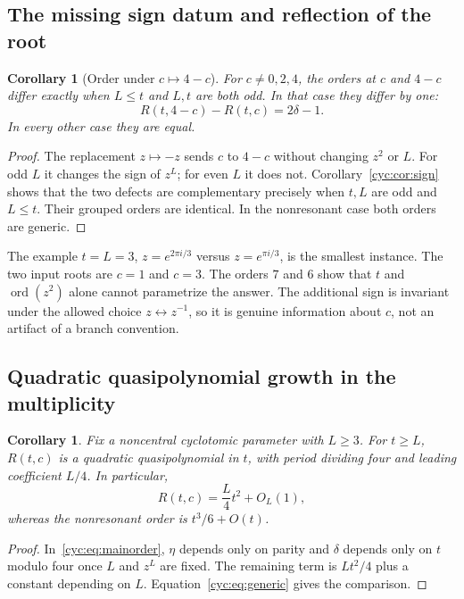 \documentclass[11pt,a4paper]{article}
\numberwithin{equation}{section}
\newtheorem{corollary}[theorem]{Corollary}
\theoremstyle{definition}
\theoremstyle{remark}
\newcommand{\ord}{\operatorname{ord}}
\begin{document}
\subsection{The missing sign datum and reflection of the root}
\begin{corollary}[Order under $c\mapsto4-c$]\label{cyc:cor:c-reflect}
For $c\ne0,2,4$, the orders at $c$ and $4-c$ differ exactly when
$L\le t$ and $L,t$ are both odd.  In that case they differ by one:
\begin{equation}\label{cyc:eq:c-reflect}
 R(t,4-c)-R(t,c)=2\delta-1.
\end{equation}
In every other case they are equal.
\end{corollary}
\begin{proof}
The replacement $z\mapsto-z$ sends $c$ to $4-c$ without changing
$z^2$ or $L$.  For odd $L$ it changes the sign of $z^L$; for even
$L$ it does not.  Corollary~\ref{cyc:cor:sign} shows that the two defects
are complementary precisely when $t,L$ are odd and $L\le t$.
Their grouped orders are identical.  In the nonresonant case both
orders are generic.
\end{proof}

The example $t=L=3$, $z=e^{2\pi i/3}$ versus $z=e^{\pi i/3}$,
is the smallest instance.  The two input roots are $c=1$ and $c=3$.
The orders $7$ and $6$ show that $t$ and $\ord(z^2)$ alone cannot
parametrize the answer.  The additional sign is invariant under the
allowed choice $z\leftrightarrow z^{-1}$, so it is genuine information
about $c$, not an artifact of a branch convention.

\subsection{Quadratic quasipolynomial growth in the multiplicity}
\begin{corollary}\label{cyc:cor:quasipoly}
Fix a noncentral cyclotomic parameter with $L\ge3$.  For $t\ge L$,
$R(t,c)$ is a quadratic quasipolynomial in $t$, with period dividing
four and leading coefficient $L/4$.  In particular,
\begin{equation}\label{cyc:eq:quadratic}
 R(t,c)=\frac L4t^2+O_L(1),
\end{equation}
whereas the nonresonant order is $t^3/6+O(t)$.
\end{corollary}
\begin{proof}
In~\eqref{cyc:eq:mainorder}, $\eta$ depends only on parity and $\delta$
depends only on $t$ modulo four once $L$ and $z^L$ are fixed.
The remaining term is $Lt^2/4$ plus a constant depending on $L$.
Equation~\eqref{cyc:eq:generic} gives the comparison.
\end{proof}
\end{document}
